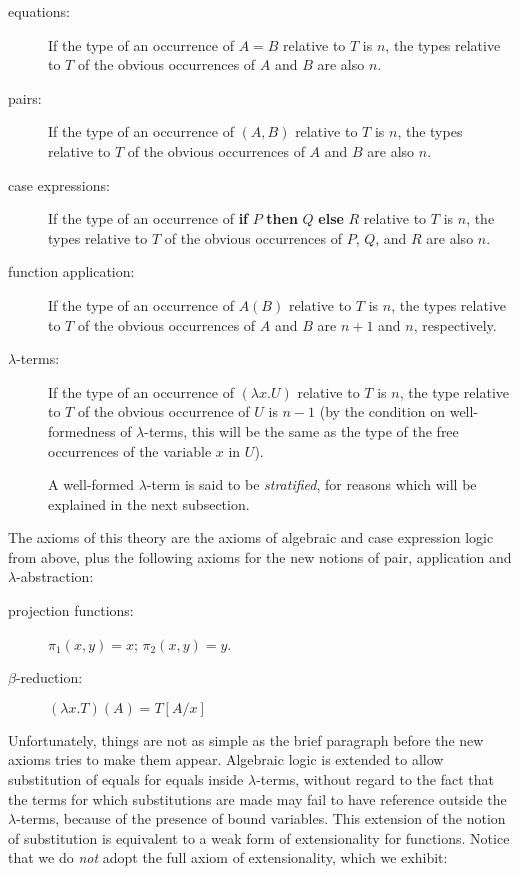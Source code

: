 \documentclass{kluwer}
\begin{document}
\begin{article}
\begin{description}
\item [equations:]  
If the type of an occurrence of $A = B$ relative to $T$ is $n$, the
types relative to $T$ of the obvious occurrences of $A$ and $B$ are
also $n$.

\item [pairs:]  
If the type of an occurrence of $(A,B)$ relative to $T$ is $n$, the
types relative to $T$ of the obvious occurrences of $A$ and $B$ are
also $n$.

\item [case expressions:]  
If the type of an occurrence of {\bf if} $P$ {\bf then} $Q$ {\bf else}
$R$ relative to $T$ is $n$, the types relative to $T$ of the obvious
occurrences of $P$, $Q$, and $R$ are also $n$.

\item [function application:] 
If the type of an occurrence of $A(B)$ relative to $T$ is $n$, the
types relative to $T$ of the obvious occurrences of $A$ and $B$ are
$n+1$ and $n$, respectively.

\item[$\lambda$-terms:]
If the type of an occurrence of $(\lambda x.U)$ relative to $T$ is
$n$, the type relative to $T$ of the obvious occurrence of $U$ is
$n-1$ (by the condition on well-formedness of $\lambda$-terms, this
will be the same as the type of the free occurrences of the variable
$x$ in $U$).

A well-formed $\lambda$-term is said to be {\em stratified\/}, for
reasons which will be explained in the next subsection.

\end{description}

The axioms of this theory are the axioms of algebraic and case
expression logic from above, plus the following axioms for the new
notions of pair, application and $\lambda$-abstraction:

\begin{description}

\item[projection functions:]  $\pi_1(x,y) = x$; $\pi_2(x,y) = y$.

\item[$\beta$-reduction:]  $(\lambda x.T)(A) = T[A/x]$

\end{description}

Unfortunately, things are not as simple as the brief paragraph before
the new axioms tries to make them appear.  Algebraic logic is extended
to allow substitution of equals for equals inside $\lambda$-terms,
without regard to the fact that the terms for which substitutions are
made may fail to have reference outside the $\lambda$-terms, because
of the presence of bound variables.  This extension of the notion of
substitution is equivalent to a weak form of extensionality for
functions.  Notice that we do {\em not\/} adopt the full axiom of
extensionality, which we exhibit:


\end{article}
\end{document}
